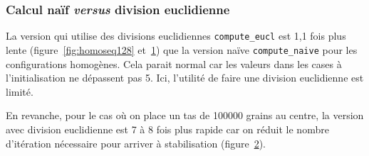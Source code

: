 \begin{figure}[!ht]
  \caption{}
  \label{fig:homoseq512}
\end{figure}

\begin{figure}[!ht]
  \caption{}
  \label{fig:tourseq}
\end{figure}

\subsubsection{Calcul naïf \textit{versus} division euclidienne}

La version qui utilise des divisions euclidiennes
\texttt{compute\_eucl} est 1,1 fois plus lente
(figure~\ref{fig:homoseq128} et~\ref{fig:homoseq512}) que la version
naïve \texttt{compute\_naive} pour les configurations homogènes. Cela
parait normal car les valeurs dans les cases à l'initialisation ne
dépassent pas 5. Ici, l'utilité de faire une division euclidienne est
limité.
\medskip

En revanche, pour le cas où on place un tas de 100000 grains au
centre, la version avec division euclidienne est 7 à 8 fois plus
rapide car on réduit le nombre d'itération nécessaire pour arriver à
stabilisation (figure~\ref{fig:tourseq}).

